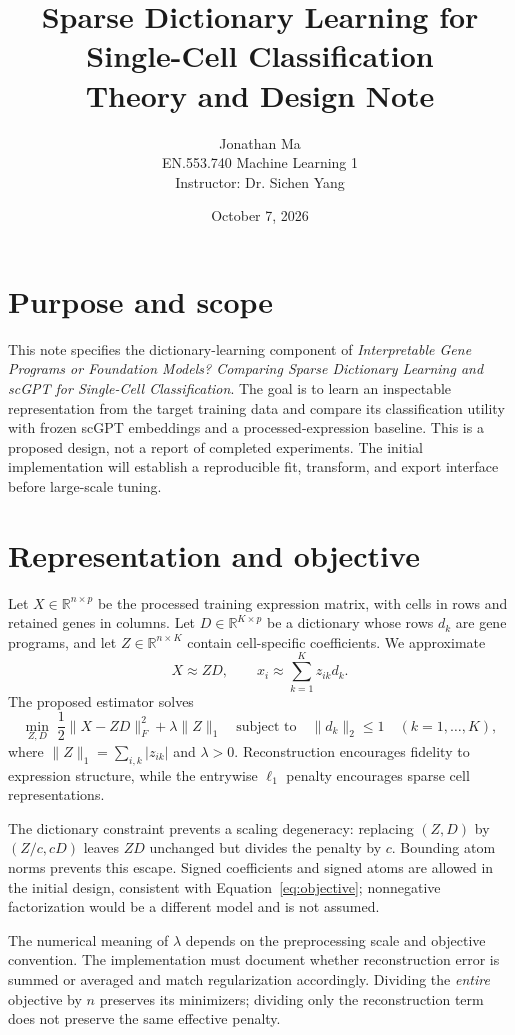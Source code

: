 \documentclass[11pt]{article}
\title{Sparse Dictionary Learning for Single-Cell Classification\\
\large Theory and Design Note}
\author{Jonathan Ma\\EN.553.740 Machine Learning 1\\Instructor: Dr. Sichen Yang}
\date{October 7, 2026}
\begin{document}
\maketitle

\section{Purpose and scope}
This note specifies the dictionary-learning component of \emph{Interpretable Gene Programs or Foundation Models? Comparing Sparse Dictionary Learning and scGPT for Single-Cell Classification}. The goal is to learn an inspectable representation from the target training data and compare its classification utility with frozen scGPT embeddings and a processed-expression baseline. This is a proposed design, not a report of completed experiments. The initial implementation will establish a reproducible fit, transform, and export interface before large-scale tuning.

\section{Representation and objective}
Let $X\in\mathbb{R}^{n\times p}$ be the processed training expression matrix, with cells in rows and retained genes in columns. Let $D\in\mathbb{R}^{K\times p}$ be a dictionary whose rows $d_k$ are gene programs, and let $Z\in\mathbb{R}^{n\times K}$ contain cell-specific coefficients. We approximate
\[
X\approx ZD,\qquad x_i\approx\sum_{k=1}^{K}z_{ik}d_k.
\]
The proposed estimator solves
\begin{equation}
\min_{Z,D}\;\frac12\lVert X-ZD\rVert_F^2+\lambda\lVert Z\rVert_1
\quad\text{subject to}\quad \lVert d_k\rVert_2\leq 1\quad(k=1,\ldots,K),
\label{eq:objective}
\end{equation}
where $\lVert Z\rVert_1=\sum_{i,k}|z_{ik}|$ and $\lambda>0$. Reconstruction encourages fidelity to expression structure, while the entrywise $\ell_1$ penalty encourages sparse cell representations.

The dictionary constraint prevents a scaling degeneracy: replacing $(Z,D)$ by $(Z/c,cD)$ leaves $ZD$ unchanged but divides the penalty by $c$. Bounding atom norms prevents this escape. Signed coefficients and signed atoms are allowed in the initial design, consistent with Equation~\eqref{eq:objective}; nonnegative factorization would be a different model and is not assumed.

The numerical meaning of $\lambda$ depends on the preprocessing scale and objective convention. The implementation must document whether reconstruction error is summed or averaged and match regularization accordingly. Dividing the \emph{entire} objective by $n$ preserves its minimizers; dividing only the reconstruction term does not preserve the same effective penalty.
\end{document}
